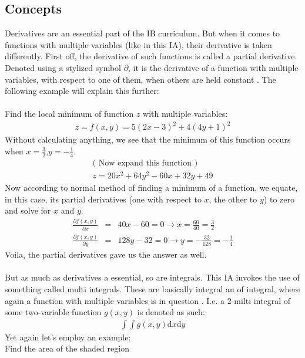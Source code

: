 \documentclass[11pt,a4paper]{article}
\numberwithin{equation}{subsection}
\begin{document}
\subsection{Concepts}
Derivatives are an essential part of the IB curriculum. But when it comes to functions with multiple variables (like in this IA), their derivative is taken differently. First off, the derivative of such functions is called a partial derivative. Denoted using a stylized symbol $\partial$, it is the derivative of a function with multiple variables, with respect to one of them, when others are held constant \cite{matthews_1998}. The following example will explain this further:\\
\\
Find the local minimum of function $z$ with multiple variables:
\begin{gather*}
z = f(x,y) = 5(2x-3)^{2} + 4(4y+1)^{2}
\end{gather*}
Without calculating anything, we see that the minimum of this function occurs when $x= \frac{3}{2} $,$ y= -\frac{1}{4}$.
\begin{gather*}
\text{( Now expand this function )}\\
z = 20x^{2} + 64y^{2} -60x + 32y +49
\end{gather*}
Now according to normal method of finding a minimum of a function, we equate, in this case, its partial derivatives (one with respect to $x$, the other to $y$) to zero and solve for $x$ and $y$.
\begin{eqnarray*}
\frac{\partial f(x,y)}{\partial x}  &=&  40x-60 = 0 \rightarrow x = \frac{60}{40}=\frac{3}{2}\\
\frac{\partial f(x,y)}{\partial y}  &=&  128y-32 = 0 \rightarrow y = -\frac{32}{128}=-\frac{1}{4}
\end{eqnarray*}
Voila, the partial derivatives gave us the answer as well.\\
\\
But as much as derivatives a essential, so are integrals. This IA invokes the use of something called multi integrals. These are basically integral an of integral, where again a function with multiple variables is in question \cite{stewart_2008}. I.e. a 2-milti integral of some two-variable function $g(x,y)$ is denoted as such:
\begin{gather*}
\int \int g(x,y) \mathrm{d}x\mathrm{d}y
\end{gather*}
Yet again let's employ an example: \\
Find the area of the shaded region\\
\end{document}
